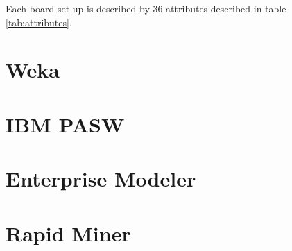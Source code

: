 \documentclass[11pt]{article}
\begin{document}
Each board set up is described by 36 attributes described in table \ref{tab:attributes}.

\section{Weka}
\section{IBM PASW}
\section{Enterprise Modeler}
\section{Rapid Miner}
\end{document}
